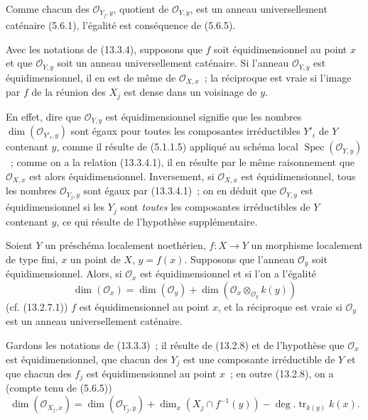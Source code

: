 Comme chacun des $\mathcal O_{Y_j,y}$, quotient de $\mathcal O_{Y,y}$, est un
anneau universellement caténaire (5.6.1), l'égalité est conséquence de (5.6.5).

\begin{corollary}[13.3.5]
\label{IV.13.3.5-fr}
Avec les notations de (13.3.4), supposons que $f$ soit équidimensionnel au
point $x$ et que $\mathcal O_{Y,y}$ soit un anneau universellement caténaire.
Si l'anneau $\mathcal O_{Y,y}$ est équidimensionnel, il en est de même de
$\mathcal O_{X,x}$~; la réciproque est vraie si l'image par $f$ de la réunion
des $X_j$ est dense dans un voisinage de $y$.
\end{corollary}

En effet, dire que $\mathcal O_{Y,y}$ est équidimensionnel signifie que les
nombres $\dim(\mathcal O_{Y'_i,y})$ sont égaux pour toutes les composantes
irréductibles $Y'_i$ de $Y$ contenant $y$, comme il résulte de (5.1.1.5)
appliqué au schéma local $\operatorname{Spec}(\mathcal O_{Y,y})$~; comme on a
la relation (13.3.4.1), il en résulte par le même raisonnement que
$\mathcal O_{X,x}$ est alors équidimensionnel. Inversement, si
$\mathcal O_{X,x}$ est équidimensionnel, tous les nombres
$\mathcal O_{Y_j,y}$ sont égaux par (13.3.4.1)~; on en déduit que
$\mathcal O_{Y,y}$ est équidimensionnel si les $Y_j$ sont \emph{toutes} les
composantes irréductibles de $Y$ contenant $y$, ce qui résulte de l'hypothèse
supplémentaire.

\begin{proposition}[13.3.6]
\label{IV.13.3.6-fr}
Soient $Y$ un préschéma localement noethérien, $f:X\to Y$ un morphisme
localement de type fini, $x$ un point de $X$, $y=f(x)$. Supposons que l'anneau
$\mathcal O_y$ soit équidimensionnel. Alors, si $\mathcal O_x$ est
équidimensionnel et si l'on a l'égalité
\[
\tag{13.3.6.1}
\label{IV.13.3.6.1-fr}
  \dim(\mathcal O_x)=\dim(\mathcal O_y)
  +\dim(\mathcal O_x\otimes_{\mathcal O_y}k(y))
\]
(cf. (13.2.7.1)) $f$ est équidimensionnel au point $x$, et la réciproque est
vraie si $\mathcal O_y$ est un anneau universellement caténaire.
\end{proposition}

Gardons les notations de (13.3.3)~; il résulte de (13.2.8) et de l'hypothèse
que $\mathcal O_x$ est équidimensionnel, que chacun des $Y_j$ est une
composante irréductible de $Y$ et que chacun des $f_j$ est équidimensionnel au
point $x$~; en outre (13.2.8), on a (compte tenu de (5.6.5))
\[
  \dim(\mathcal O_{X_j,x})=\dim(\mathcal O_{Y_j,y})
  +\dim_x(X_j\cap f^{-1}(y))-\deg.\operatorname{tr}_{k(y)}k(x).
\]

